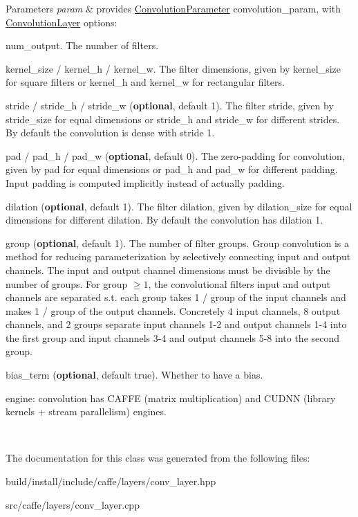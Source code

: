 \begin{DoxyParams}{Parameters}
{\em param} & provides \mbox{\hyperlink{classcaffe_1_1_convolution_parameter}{Convolution\+Parameter}} convolution\+\_\+param, with \mbox{\hyperlink{classcaffe_1_1_convolution_layer}{Convolution\+Layer}} options\+:
\begin{DoxyItemize}
\item num\+\_\+output. The number of filters.
\item kernel\+\_\+size / kernel\+\_\+h / kernel\+\_\+w. The filter dimensions, given by kernel\+\_\+size for square filters or kernel\+\_\+h and kernel\+\_\+w for rectangular filters.
\item stride / stride\+\_\+h / stride\+\_\+w ({\bfseries optional}, default 1). The filter stride, given by stride\+\_\+size for equal dimensions or stride\+\_\+h and stride\+\_\+w for different strides. By default the convolution is dense with stride 1.
\item pad / pad\+\_\+h / pad\+\_\+w ({\bfseries optional}, default 0). The zero-\/padding for convolution, given by pad for equal dimensions or pad\+\_\+h and pad\+\_\+w for different padding. Input padding is computed implicitly instead of actually padding.
\item dilation ({\bfseries optional}, default 1). The filter dilation, given by dilation\+\_\+size for equal dimensions for different dilation. By default the convolution has dilation 1.
\item group ({\bfseries optional}, default 1). The number of filter groups. Group convolution is a method for reducing parameterization by selectively connecting input and output channels. The input and output channel dimensions must be divisible by the number of groups. For group $ \geq 1 $, the convolutional filters\textquotesingle{} input and output channels are separated s.\+t. each group takes 1 / group of the input channels and makes 1 / group of the output channels. Concretely 4 input channels, 8 output channels, and 2 groups separate input channels 1-\/2 and output channels 1-\/4 into the first group and input channels 3-\/4 and output channels 5-\/8 into the second group.
\item bias\+\_\+term ({\bfseries optional}, default true). Whether to have a bias.
\item engine\+: convolution has C\+A\+F\+FE (matrix multiplication) and C\+U\+D\+NN (library kernels + stream parallelism) engines. 
\end{DoxyItemize}\\
\hline
\end{DoxyParams}


The documentation for this class was generated from the following files\+:\begin{DoxyCompactItemize}
\item 
build/install/include/caffe/layers/conv\+\_\+layer.\+hpp\item 
src/caffe/layers/conv\+\_\+layer.\+cpp\end{DoxyCompactItemize}
